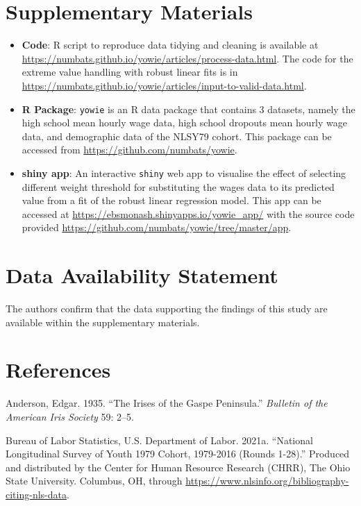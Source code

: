 \documentclass[12pt]{article}
\begin{document}
\hypertarget{supplementary-materials}{%
\section{Supplementary Materials}\label{supplementary-materials}}

\begin{itemize}
\item
  \textbf{Code}: R script to reproduce data tidying and cleaning is available at \url{https://numbats.github.io/yowie/articles/process-data.html}. The code for the extreme value handling with robust linear fits is in \url{https://numbats.github.io/yowie/articles/input-to-valid-data.html}.
\item
  \textbf{R Package}: \texttt{yowie} is an R data package that contains 3 datasets, namely the high school mean hourly wage data, high school dropouts mean hourly wage data, and demographic data of the NLSY79 cohort. This package can be accessed from \url{https://github.com/numbats/yowie}.
\item
  \textbf{shiny app}: An interactive \texttt{shiny} web app to visualise the effect of selecting different weight threshold for substituting the wages data to its predicted value from a fit of the robust linear regression model. This app can be accessed at \url{https://ebsmonash.shinyapps.io/yowie_app/} with the source code provided \url{https://github.com/numbats/yowie/tree/master/app}.
\end{itemize}

\hypertarget{data-availability-statement}{%
\section{Data Availability Statement}\label{data-availability-statement}}

The authors confirm that the data supporting the findings of this study are available within the supplementary materials.

\hypertarget{references}{%
\section*{References}\label{references}}

\hypertarget{refs}{}
\leavevmode\hypertarget{ref-iris-data}{}%
Anderson, Edgar. 1935. ``The Irises of the Gaspe Peninsula.'' \emph{Bulletin of the American Iris Society} 59: 2--5.

\leavevmode\hypertarget{ref-nlsy79}{}%
Bureau of Labor Statistics, U.S. Department of Labor. 2021a. ``National Longitudinal Survey of Youth 1979 Cohort, 1979-2016 (Rounds 1-28).'' Produced and distributed by the Center for Human Resource Research (CHRR), The Ohio State University. Columbus, OH, through \url{https://www.nlsinfo.org/bibliography-citing-nls-data}.
\end{document}
